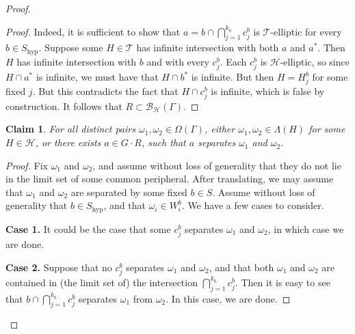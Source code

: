 \documentclass[11pt,a4paper]{amsart}
\newtheorem{claim}[theorem]{Claim}
\theoremstyle{definition}
\newcommand{\per}{\mathcal{H}}
\newcommand{\br}{{\mathscr{B}}}
\begin{document}
\begin{proof}
        \begin{proof}
            Indeed, it is sufficient to show that $a = b \cap \bigcap_{j=1}^{k_b} c_j^b $ is $\mathcal T$-elliptic for every $b \in S_{\mathrm{hyp}}$. Suppose some $H \in \mathcal T$ has infinite intersection with both $a$ and $a^\ast$. Then $H$ has infinite intersection with $b$ and with every $c_j^b$. Each $c_j^b$ is $\mathcal H$-elliptic, so since $H \cap a^\ast$ is infinite, we must have that $H \cap b^\ast$ is infinite. But then $H = H_j^b$ for some fixed $j$. But this contradicts the fact that $H \cap c_j^b$ is infinite, which is false by construction. It follows that $R \subset \br_\per(\Gamma)$. 
        \end{proof}

        \begin{claim}
             For all distinct pairs  $\omega_1, \omega_2 \in \Omega(\Gamma)$, either $\omega_1, \omega_2 \in \Lambda(H)$ for some $H \in \per$, or there exists $a \in G \cdot R$, such that $a$ separates $\omega_1$ and $\omega_2$.
        \end{claim}

        \begin{proof}
            
        
        
        Fix $\omega_1$ and $\omega_2$, and assume without loss of generality that they do not lie in the limit set of some common peripheral. After translating, we may assume that $\omega_1$ and $\omega_2$ are separated by some fixed $b \in S$. Assume without loss of generality that $b \in S_{\mathrm{hyp}}$, and that $\omega_i \in W_i^b$. We have a few cases to consider. 

        \textbf{Case 1.} It could be the case that some $c_j^b$ separates $\omega_1$ and $\omega_2$, in which case we are done. 

        \textbf{Case 2.} Suppose that no $c_j^b$ separates $\omega_1$ and $\omega_2$, and that both $\omega_1$ and $\omega_2$ are contained in (the limit set of) the intersection
        $
        \bigcap_{j=1}^{k_b} c_j^b
        $.
        Then it is easy to see that 
        $
        b \cap \bigcap_{j=1}^{k_b} c_j^b 
        $
        separates $\omega_1$ from $\omega_2$. In this case, we are done. 


\end{proof}
\end{proof}
\end{document}
